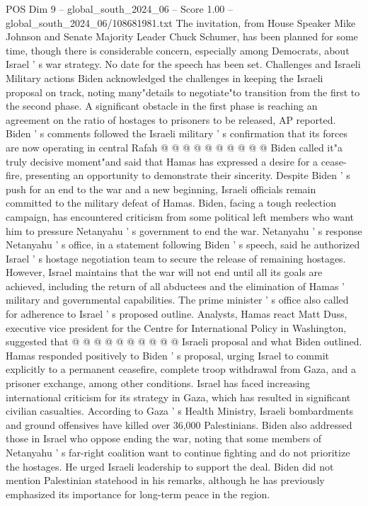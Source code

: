 \begin{textsample}{POS Dim 9 – global\_south\_2024\_06 – Score 1.00 – global\_south\_2024\_06/108681981.txt}
The invitation, from House Speaker Mike Johnson and Senate Majority Leader Chuck Schumer, has been planned for some time, though there is considerable concern, especially among Democrats, about Israel ' s war strategy.
No date for the speech has been set.
Challenges and Israeli Military actions Biden acknowledged the challenges in keeping the Israeli proposal on track, noting many"details to negotiate"to transition from the first to the second phase.
A significant obstacle in the first phase is reaching an agreement on the ratio of hostages to prisoners to be released, AP reported.
Biden ' s comments followed the Israeli military ' s confirmation that its forces are now operating in central Rafah @ @ @ @ @ @ @ @ @ @ Biden called it"a truly decisive moment"and said that Hamas has expressed a desire for a cease-fire, presenting an opportunity to demonstrate their sincerity.
Despite Biden ' s push for an end to the war and a new beginning, Israeli officials remain committed to the military defeat of Hamas.
Biden, facing a tough reelection campaign, has encountered criticism from some political left members who want him to pressure Netanyahu ' s government to end the war.
Netanyahu ' s response Netanyahu ' s office, in a statement following Biden ' s speech, said he authorized Israel ' s hostage negotiation team to secure the release of remaining hostages.
However, Israel maintains that the war will not end until all its goals are achieved, including the return of all abductees and the elimination of Hamas ' military and governmental capabilities.
The prime minister ' s office also called for adherence to Israel ' s proposed outline.
Analysts, Hamas react Matt Duss, executive vice president for the Centre for International Policy in Washington, suggested that @ @ @ @ @ @ @ @ @ @ Israeli proposal and what Biden outlined.
Hamas responded positively to Biden ' s proposal, urging Israel to commit explicitly to a permanent ceasefire, complete troop withdrawal from Gaza, and a prisoner exchange, among other conditions.
Israel has faced increasing international criticism for its strategy in Gaza, which has resulted in significant civilian casualties.
According to Gaza ' s Health Ministry, Israeli bombardments and ground offensives have killed over 36,000 Palestinians.
Biden also addressed those in Israel who oppose ending the war, noting that some members of Netanyahu ' s far-right coalition want to continue fighting and do not prioritize the hostages.
He urged Israeli leadership to support the deal.
Biden did not mention Palestinian statehood in his remarks, although he has previously emphasized its importance for long-term peace in the region.

\end{textsample}
